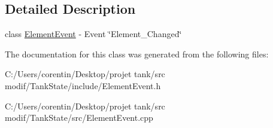 \subsection{Detailed Description}
class \hyperlink{classstate_1_1_element_event}{Element\+Event} -\/ Event \char`\"{}\+Element\+\_\+\+Changed\char`\"{} 

The documentation for this class was generated from the following files\+:\begin{DoxyCompactItemize}
\item 
C\+:/\+Users/corentin/\+Desktop/projet tank/src modif/\+Tank\+State/include/Element\+Event.\+h\item 
C\+:/\+Users/corentin/\+Desktop/projet tank/src modif/\+Tank\+State/src/Element\+Event.\+cpp\end{DoxyCompactItemize}
